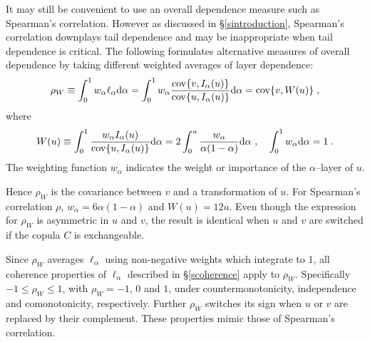 \documentclass[authoryear]{elsarticle}
\newcommand{\cov}{{\rm cov}}
\newcommand{\de}{\mathrm{d}}
\newcommand{\cq}{\ ,\quad }
\newcommand{\sref}[1]{\S\ref{#1}}
\begin{document}
It may still be convenient to use an overall dependence measure such as Spearman's correlation. However as discussed in \sref{sintroduction}, Spearman's correlation downplays tail dependence and may be inappropriate when tail dependence is critical. The following formulates alternative measures of overall dependence by taking different weighted averages of layer dependence:
$$
\rho_W\equiv  \int_0^1 w_\alpha \ell_\alpha \de \alpha
= \int_0^1 w_\alpha \frac{ \cov\{v,I_\alpha(u)\}}{\cov\{u,I_\alpha(u)\}} \de \alpha=\cov\{v,W(u)\} \;,
$$
where
$$
W(u)\equiv \int_0^1 \frac{w_\alpha I_\alpha(u)}{\cov\{u,I_\alpha(u)\}}\de\alpha
= 2\int_0^u \frac{w_\alpha }{\alpha(1-\alpha)}\de\alpha
\cq \int_0^1 w_\alpha \de\alpha=1 \;.
$$
The weighting function $w_\alpha$ indicates the weight or importance of the $\alpha$--layer of $u$.

Hence  $\rho_W$ is the  covariance between $v$ and a transformation of $u$. For Spearman's correlation $\rho$, $w_\alpha=6\alpha(1-\alpha)$ and $W(u)=12u$. Even though the expression for $\rho_W$ is asymmetric in $u$ and $v$, the result is identical when $u$ and $v$ are switched if the copula $C$ is exchangeable.

Since $\rho_W$ averages $\ell_\alpha$ using non-negative weights which integrate to 1, all coherence properties of $\ell_\alpha$ described in \sref{scoherence} apply to $\rho_W$. Specifically $-1\le\rho_W\le 1$, with $\rho_W=-1$, $0$ and $1$, under countermonotonicity, independence and comonotonicity, respectively.   Further $\rho_W$ switches its sign when $u$ or $v$ are replaced by their complement.  These properties mimic those of Spearman's correlation.
\end{document}
